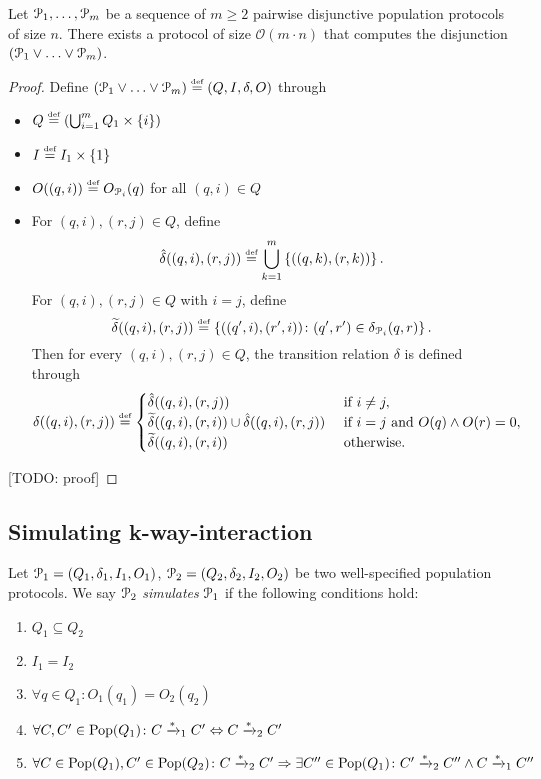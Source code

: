 \begin{lemma}
	 Let $\mathcal{P}_1, \ldots, \mathcal{P}_m$ be a sequence of $m \geq 2$  
	pairwise disjunctive population protocols of size $n$.
	There exists a protocol of size 
	$\mathcal{O}\left(m \cdot  n \right)$ that computes the 
	disjunction $(\mathcal{P}_1 \lor \ldots \lor \mathcal{P}_m)$.
\end{lemma}
\begin{proof}
	Define $(\mathcal{P}_1 \lor \ldots \lor \mathcal{P}_m) \stackrel{\scriptscriptstyle\text{def}}{=} (Q, I, \delta, O)$ through 
	\begin{itemize}
		\item $Q \stackrel{\scriptscriptstyle\text{def}}{=} \left(\bigcup_{i=1}^m Q_1 \times \left\{i\right\}\right)$
		\item $I \stackrel{\scriptscriptstyle\text{def}}{=} I_1 \times \left\{1\right\}$
		\item $O((q, i)) \stackrel{\scriptscriptstyle\text{def}}{=} O_{\mathcal{P}_i}(q)$ for all $(q, i) \in Q$
		\item For $(q, i), (r, j) \in Q$, define 
			  $$\hat{\delta}((q, i), (r, j)) \stackrel{\scriptscriptstyle\text{def}}{=} \bigcup_{k=1}^m 
			  \left\{((q, k), (r, k))\right\}.$$
			  For $(q, i), (r, j) \in Q$ with $i = j$, define 
			  $$\widetilde{\delta}((q, i), (r, j)) \stackrel{\scriptscriptstyle\text{def}}{=} \left\{((q', i), (r', i)) 
			  \colon (q', r') \in \delta_{\mathcal{P}_i}(q, r)\right\}.$$
			  Then for every $(q, i), (r, j) \in Q$, the transition relation 
			  $\delta$ is defined through
			  $$
			  \delta((q, i), (r, j)) \stackrel{\scriptscriptstyle\text{def}}{=} 
			  \begin{cases}
			  	\hat{\delta}((q, i), (r, j)) & \text{ if } i \neq j, \\
			  	\widetilde{\delta}((q, i), (r, i)) \cup \hat{\delta}((q, i), (r, j)) & 
			  	\text{ if } i = j \text{ and } O(q) \land O(r) = 0, \\
			  	\widetilde{\delta}((q, i), (r, i)) & \text{ otherwise.}
			  \end{cases}
			  $$
	\end{itemize}
	[TODO: proof]
\end{proof} 

\subsection*{Simulating k-way-interaction}
Let $\mathcal{P}_1=(Q_1, \delta_1, I_1, O_1)$, $\mathcal{P}_2=(Q_2, \delta_2, I_2, O_2)$ 
be two well-specified population protocols. We say $\mathcal{P}_2$ 
\emph{simulates} $\mathcal{P}_1$ if the following conditions hold:
\begin{enumerate}
	\item $Q_1 \subseteq Q_2$
	\item $I_1 = I_2$
	\item $\forall q \in Q_1 \colon O_1(q_1) = O_2(q_2)$
	\item $\forall C, C' \in \mathrm{Pop}(Q_1) \colon 
	       C \xrightarrow{*}_1 C' \Leftrightarrow C \xrightarrow{*}_2 C'$
	\item $\forall C \in \mathrm{Pop}(Q_1), C' \in \mathrm{Pop}(Q_2) \colon 
	       C \xrightarrow{*}_2 C' \Rightarrow \exists C'' \in \mathrm{Pop}(Q_1) 
	       \colon C' \xrightarrow{*}_2 C'' \land C \xrightarrow{*}_1 C''$
\end{enumerate}

